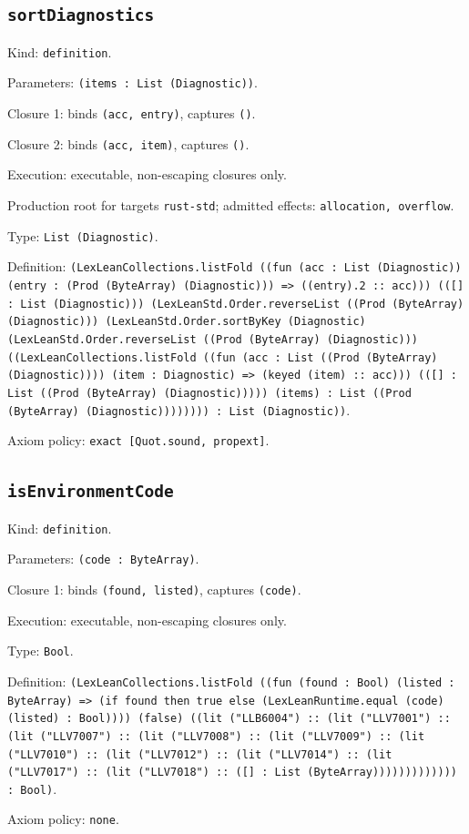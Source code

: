 \documentclass[11pt]{article}
\begin{document}
\subsection*{\texttt{sortDiagnostics}}
\noindent Kind: \texttt{definition}.\par
\noindent Parameters: \texttt{(items : List (Diagnostic))}.\par
\noindent Closure 1: binds \texttt{(acc, entry)}, captures \texttt{()}.\par
\noindent Closure 2: binds \texttt{(acc, item)}, captures \texttt{()}.\par
\noindent Execution: executable, non-escaping closures only.\par
\noindent Production root for targets \texttt{rust-std}; admitted effects: \texttt{allocation, overflow}.\par
\noindent Type: \texttt{List (Diagnostic)}.\par
\noindent Definition: \texttt{(LexLeanCollections.listFold ((fun (acc : List (Diagnostic)) (entry : (Prod (ByteArray) (Diagnostic))) => ((entry).2 :: acc))) (([] : List (Diagnostic))) (LexLeanStd.Order.reverseList ((Prod (ByteArray) (Diagnostic))) (LexLeanStd.Order.sortByKey (Diagnostic) (LexLeanStd.Order.reverseList ((Prod (ByteArray) (Diagnostic))) ((LexLeanCollections.listFold ((fun (acc : List ((Prod (ByteArray) (Diagnostic)))) (item : Diagnostic) => (keyed (item) :: acc))) (([] : List ((Prod (ByteArray) (Diagnostic))))) (items) : List ((Prod (ByteArray) (Diagnostic)))))))) : List (Diagnostic))}.\par
\noindent Axiom policy: \texttt{exact [Quot.sound, propext]}.\par
\subsection*{\texttt{isEnvironmentCode}}
\noindent Kind: \texttt{definition}.\par
\noindent Parameters: \texttt{(code : ByteArray)}.\par
\noindent Closure 1: binds \texttt{(found, listed)}, captures \texttt{(code)}.\par
\noindent Execution: executable, non-escaping closures only.\par
\noindent Type: \texttt{Bool}.\par
\noindent Definition: \texttt{(LexLeanCollections.listFold ((fun (found : Bool) (listed : ByteArray) => (if found then true else (LexLeanRuntime.equal (code) (listed) : Bool)))) (false) ((lit ("LLB6004") :: (lit ("LLV7001") :: (lit ("LLV7007") :: (lit ("LLV7008") :: (lit ("LLV7009") :: (lit ("LLV7010") :: (lit ("LLV7012") :: (lit ("LLV7014") :: (lit ("LLV7017") :: (lit ("LLV7018") :: ([] : List (ByteArray))))))))))))) : Bool)}.\par
\noindent Axiom policy: \texttt{none}.\par
\end{document}
